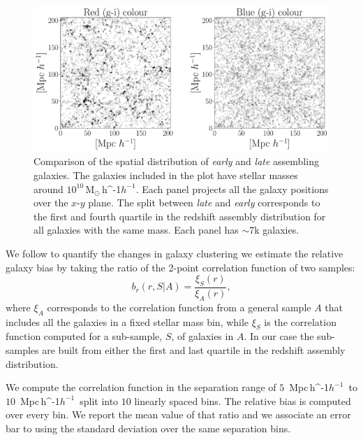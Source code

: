 \documentclass[fleqn,usenatbib]{mnras}
\newcommand{\Msunh}{\,{\rm M}$_{\odot}$\,\ifmmode h^{-1}\else $h^{-1}$\fi}
\newcommand{\Mpch}{\,{\rm Mpc}\,\ifmmode h^{-1}\else $h^{-1}$\fi}
\begin{document}
\begin{figure}
    \centering
    \includegraphics[width=1.6\columnwidth]{figuras/scatter_color.pdf}
    \caption{Comparison of the spatial distribution of \emph{early}
      and \emph{late} assembling galaxies. 
    The galaxies included in the plot have stellar masses around
    $10^{10}$\Msunh.  
    Each panel projects all the galaxy positions over the $x$-$y$
    plane.  
    The split between \emph{late} and \emph{early} corresponds to the
    first and fourth quartile in the redshift assembly distribution
    for all galaxies with the same mass. 
    Each panel has $\sim7$k galaxies. }
    \label{fig:comparison}
\end{figure}



We follow \cite{2020MNRAS.tmp.1844M} to quantify the changes in galaxy
clustering we estimate the relative galaxy bias by taking the ratio of
the 2-point correlation function of two samples: 
%
\begin{equation}
b_r(r, S|A)= \frac{\xi_S(r)}{\xi_A(r)}, 
\label{eq:relative}
\end{equation}
%
where $\xi_A$ corresponds to the correlation function from a general
sample $A$ that includes all the galaxies in a fixed stellar mass bin,
while $\xi_S$ is the correlation function computed for a sub-sample,
$S$, of galaxies in $A$. 
In our case the sub-samples are built from either the first and last
quartile in the redshift assembly distribution. 


We compute the correlation function in the separation range of
$5$ \Mpch\ to $10$ \Mpch\ split into $10$ linearly spaced bins. 
The relative bias is computed over every bin.
We report the mean value of that ratio and we associate an error bar
to using the standard deviation over the same separation bins.
\end{document}
